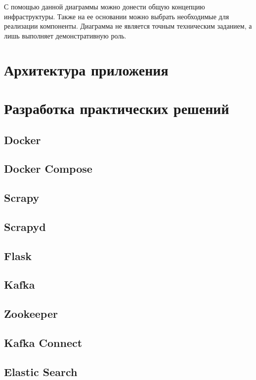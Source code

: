 С помощью данной диаграммы можно донести общую концепцию инфраструктуры. Также
на ее основании можно выбрать необходимые для реализации компоненты. Диаграмма
не является точным техническим заданием, а лишь выполняет демонстративную роль.

\section{Архитектура приложения}
\section{Разработка практических решений}
\subsection{Docker}
\subsection{Docker Compose}
\subsection{Scrapy}
\subsection{Scrapyd}
\subsection{Flask}
\subsection{Kafka}
\subsection{Zookeeper}
\subsection{Kafka Connect}
\subsection{Elastic Search}
